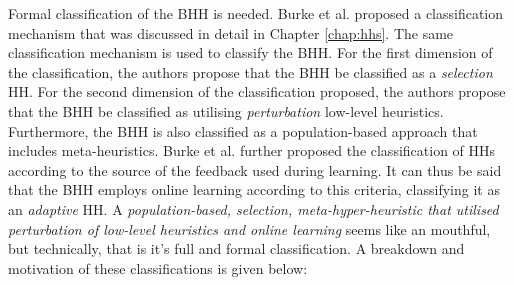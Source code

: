 Formal classification of the \Ac{BHH} is needed. Burke et al. \cite{ref:burke:2010} proposed a classification mechanism that was discussed in detail in Chapter \ref{chap:hhs}. The same classification mechanism is used to classify the \ac{BHH}. For the first dimension of the classification, the authors propose that the \Ac{BHH} be classified as a \textit{selection} \ac{HH}. For the second dimension of the classification proposed, the authors propose that the \Ac{BHH} be classified as utilising \textit{perturbation} low-level heuristics. Furthermore, the \ac{BHH} is also classified as a population-based approach that includes meta-heuristics. Burke et al. \cite{ref:burke:2010} further proposed the classification of \acp{HH} according to the source of the feedback used during learning. It can thus be said that the \ac{BHH} employs online learning according to this criteria, classifying it as an \textit{adaptive} \ac{HH}. A \textit{population-based, selection, meta-hyper-heuristic that utilised perturbation of low-level heuristics and online learning} seems like an mouthful, but technically, that is it's full and formal classification. A breakdown and motivation of these classifications is given below:

